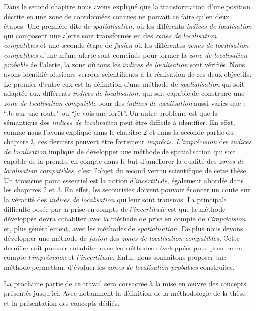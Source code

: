 Dans le second chapitre nous avons expliqué que la transformation
d'une position décrite en une zone de coordonnées connues ne pouvait
ce faire qu'en deux étapes. Une première dite de
\emph{spatialisation,} où les différents \emph{indices de
  localisation} qui composent une alerte sont transformés en des
\emph{zones de localisation compatibles} et une seconde étape de
\emph{fusion} où les différentes \emph{zones de localisation
  compatibles} d'une même alerte sont combinée pour former la
\emph{zone de localisation probable} de l'alerte, \ie la zone où tous
les \emph{indices de localisation} sont vérifiés. Nous avons identifié
plusieurs verrous scientifiques à la réalisation de ces deux
objectifs. Le premier d'entre eux est la définition d'une méthode de
\emph{spatialisation} qui soit adaptée aux différents \emph{indices de
  localisation,} \ie qui soit capable de construire une \emph{zone de
  localisation compatible} pour des \emph{indices de localisation}
aussi variés que : \enquote{Je sur une route} ou \enquote{je vois une
  forêt}.  Un autre problème est que la sémantique des \emph{indices
  de localisation} peut être difficile à identifier. En effet, comme
nous l'avons expliqué dans le chapitre 2 et dans la seconde partie du
chapitre 3, ces derniers peuvent être fortement \emph{imprécis.}
\emph{L'imprécision} des \emph{indices de localisation} implique de
développer une méthode de spatialisation qui soit capable de la
prendre en compte dans le but d'améliorer la qualité des \emph{zones
  de localisation compatibles,} c'est l'objet du second verrou
scientifique de cette thèse.  Un troisième point essentiel est la
notion \emph{d'incertitude}, également abordée dans les chapitres 2 et
3. En effet, les secouristes doivent pouvoir énoncer un doute sur la
véracité des \emph{indices de localisation} qui leur sont transmis. La
principale difficulté posée par la prise en compte de
\emph{l'incertitude} est que la méthode développée devra cohabiter
avec la méthode de prise en compte de \emph{l'imprécision} et, plus
généralement, avec les méthodes de \emph{spatialisation.}  De plus
nous devons développer une méthode de \emph{fusion} des \emph{zones de
  localisation compatibles.} Cette dernière doit pouvoir cohabiter
avec les méthodes développées pour prendre en compte
\emph{l'imprécision} et \emph{l'incertitude.} Enfin, nous souhaitons
proposer une méthode permettant d'évaluer les \emph{zones de
  localisation probables} construites.


La prochaine partie de ce travail sera consacrée à la mise en œuvre
des concepts présentés jusqu'ici. Avec notamment la définition de la
méthodologie de la thèse et la présentation des concepts dédiés.


